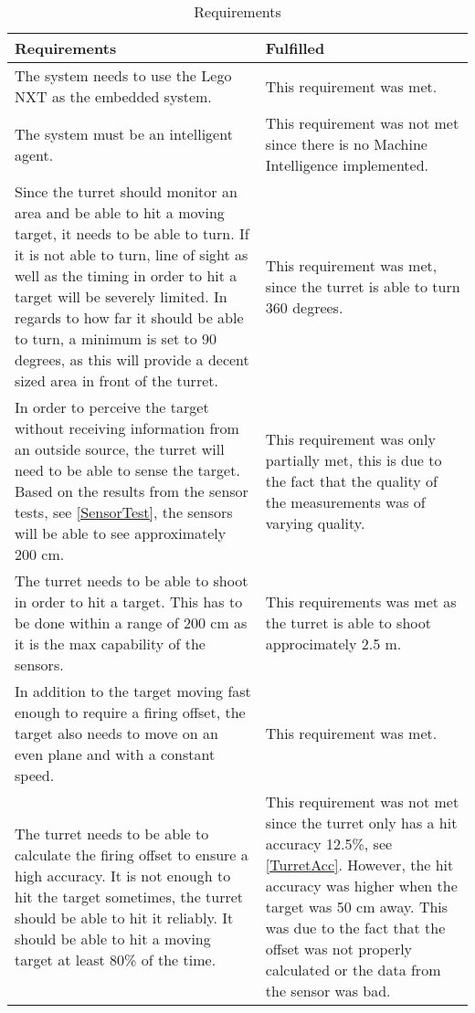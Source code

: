 \begin{table}[H]
\centering
\begin{tabular}{|p{}|p{}|}
\hline
Requirements & Fulfilled\\ \hline
 The system needs to use the Lego NXT as the embedded system. & This
 requirement was met.\\
 \hline 
 The system must be an intelligent agent. & This requirement was not met
 since there is no Machine Intelligence implemented.\\ \hline
 Since the turret should monitor an area and be able to hit a moving target,
it needs to be able to turn. If it is not able to turn, line of sight as well
as the timing in order to hit a target will be severely limited. In regards
to how far it should be able to turn, a minimum is set to 90 degrees, as
this will provide a decent sized area in front of the turret. & This requirement
was met, since the turret is able to turn 360 degrees. \\ \hline
In order to perceive the target without receiving information from an
outside source, the turret will need to be able to sense the target. Based
on the results from the sensor tests, see \autoref{SensorTest}, the sensors will
be able to see approximately 200 cm. & This requirement was only partially met,
this is due to the fact that the quality of the measurements was of varying
quality. \\ \hline
 The turret needs to be able to shoot in order to hit a target. This has to
be done within a range of 200 cm as it is the max capability of the sensors. &
This requirements was met as the turret is able to shoot approcimately 2.5 m. \\
\hline
 In addition to the target moving fast enough to require a firing offset, the
target also needs to move on an even plane and with a constant speed. & This
requirement was met. \\ \hline
The turret needs to be able to calculate the firing offset to ensure a high
accuracy. It is not enough to hit the target sometimes, the turret should
be able to hit it reliably. It should be able to hit a moving target at least
80\% of the time. & This requirement was not met since the turret only has a hit
accuracy 12.5\%, see \autoref{TurretAcc}. However, the hit accuracy was higher
when the target was 50 cm away. This was due to the fact that the offset was not
properly calculated or the data from the sensor was bad. \\ \hline
\end{tabular}
\caption{Requirements}
\label{RequirementTable}
\end{table}
